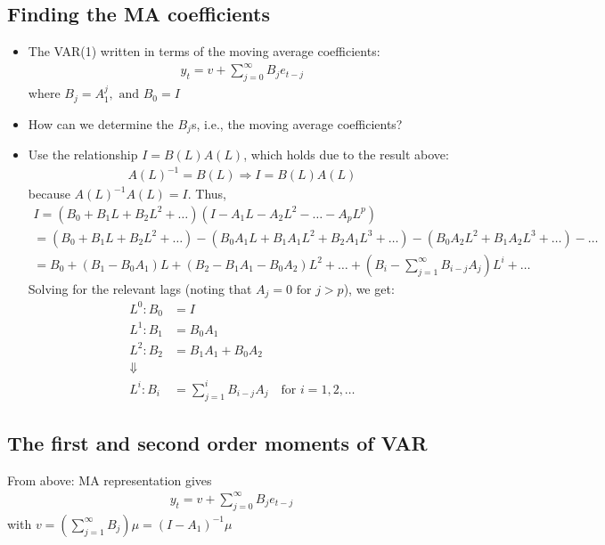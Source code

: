 \documentclass[10pt]{article}
\begin{document}
\subsection{Finding the MA coefficients}
\begin{itemize}
    \item The VAR(1) written in terms of the moving average coefficients:
    \begin{gather*}
        y_t = v + \sum_{j = 0}^{\infty}B_je_{t - j}
    \end{gather*}
    where $B_j = A_1^j, \text{ and }B_0 = I $
    \item How can we determine the $B_j $s, i.e., the moving average coefficients?
    \item Use the relationship $I = B(L)A(L) $, which holds due to the result above: 
    \begin{gather*}
        A(L)^{-1} = B(L)\Rightarrow I = B(L)A(L)
    \end{gather*}
    because $A(L)^{-1}A(L) = I $. Thus, 
    \begin{gather*}
        I = \left(B_0 + B_1L + B_2L^2 + \dots\right)\left(I - A_1L - A_2L^2 - \dots - A_pL^p\right)\\
        = \left(B_0 + B_1L + B_2L^2 + \dots\right) - \left(B_0A_1L + B_1A_1L^2 + B_2A_1L^3 + \dots \right) - \left(B_0A_2L^2 + B_1A_2L^3 + \dots\right) - \dots\\
        = B_0 + (B_1 - B_0A_1)L + (B_2 - B_1A_1 - B_0A_2)L^2 + \dots + \left(B_i - \sum_{j = 1}^{\infty}B_{i - j}A_j\right)L^i + \dots 
    \end{gather*}
    Solving for the relevant lags (noting that $A_j = 0 \text{ for } j > p $), we get: 
    \begin{align*}
        L^0 : B_0 &= I\\
        L^1 : B_1 &= B_0A_1\\
        L^2 : B_2 &= B_1A_1 + B_0A_2\\
        \Downarrow\\
        L^i : B_i &= \sum_{j = 1}^{i}B_{i - j}A_j\quad\text{for }i = 1,2, \dots
    \end{align*}
\end{itemize}
\subsection{The first and second order moments of VAR}
From above: MA representation gives 
\begin{gather*}
    y_t = v + \sum_{j = 0}^{\infty}B_je_{t - j}
\end{gather*}
with $v = \left(\sum_{j = 1}^{\infty}B_j\right)\mu = (I - A_1)^{-1}\mu $
\end{document}

